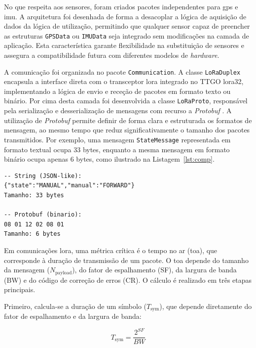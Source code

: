 No que respeita aos sensores, foram criados pacotes independentes para \gls{gps} e \gls{imu}. A arquitetura foi desenhada de forma a desacoplar a lógica de aquisição de dados da lógica de utilização, permitindo que qualquer sensor capaz de preencher as estruturas \texttt{GPSData} ou \texttt{IMUData} seja integrado sem modificações na camada de aplicação. Esta característica garante flexibilidade na substituição de sensores e assegura a compatibilidade futura com diferentes modelos de \emph{hardware}.  

A comunicação foi organizada no pacote \texttt{Communication}. A classe \texttt{LoRaDuplex} encapsula a interface direta com o transceptor \gls{lora} integrado no TTGO \gls{lora}32, implementando a lógica de envio e receção de pacotes em formato texto ou binário. Por cima desta camada foi desenvolvida a classe \texttt{LoRaProto}, responsável pela serialização e desserialização de mensagens com recurso a \emph{Protobuf} \cite{google-protobuf}. A utilização de \emph{Protobuf} permite definir de forma clara e estruturada os formatos de mensagem, ao mesmo tempo que reduz significativamente o tamanho dos pacotes transmitidos. Por exemplo, uma mensagem \texttt{StateMessage} representada em formato textual ocupa 33 bytes, enquanto a mesma mensagem em formato binário ocupa apenas 6 bytes, como ilustrado na Listagem~\ref{lst:comp}.

\begin{lstlisting}[style={BetterCPP},caption={Comparação entre representação textual e binária com \emph{Protobuf}},label={lst:comp}]
-- String (JSON-like):
{"state":"MANUAL","manual":"FORWARD"}
Tamanho: 33 bytes

-- Protobuf (binario):
08 01 12 02 08 01
Tamanho: 6 bytes
\end{lstlisting}

Em comunicações \gls{lora}, uma métrica crítica é o tempo no ar (\acrfull{toa}), que corresponde à duração de transmissão de um pacote. O \gls{toa} depende do tamanho da mensagem ($N_{\text{payload}}$), do fator de espalhamento (SF), da largura de banda (BW) e do código de correção de erros (CR). O cálculo é realizado em três etapas principais.  

Primeiro, calcula-se a duração de um símbolo ($T_{\text{sym}}$), que depende diretamente do fator de espalhamento e da largura de banda:

\begin{equation}
T_{\text{sym}} = \frac{2^{SF}}{BW}
\label{eq:toa1}
\end{equation}

